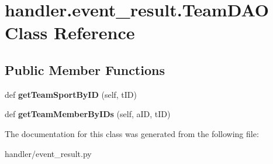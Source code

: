 \hypertarget{classhandler_1_1event__result_1_1_team_d_a_o}{}\section{handler.\+event\+\_\+result.\+Team\+D\+AO Class Reference}
\label{classhandler_1_1event__result_1_1_team_d_a_o}
\subsection*{Public Member Functions}
\begin{DoxyCompactItemize}
\item 
\mbox{\label{classhandler_1_1event__result_1_1_team_d_a_o_af884e0b40f3e1edcbde4d387bf9a1b85}} 
def {\bfseries get\+Team\+Sport\+By\+ID} (self, t\+ID)
\item 
\mbox{\label{classhandler_1_1event__result_1_1_team_d_a_o_a556bd931d883e272f9fc09013d44d76a}} 
def {\bfseries get\+Team\+Member\+By\+I\+Ds} (self, a\+ID, t\+ID)
\end{DoxyCompactItemize}


The documentation for this class was generated from the following file\+:\begin{DoxyCompactItemize}
\item 
handler/event\+\_\+result.\+py\end{DoxyCompactItemize}
